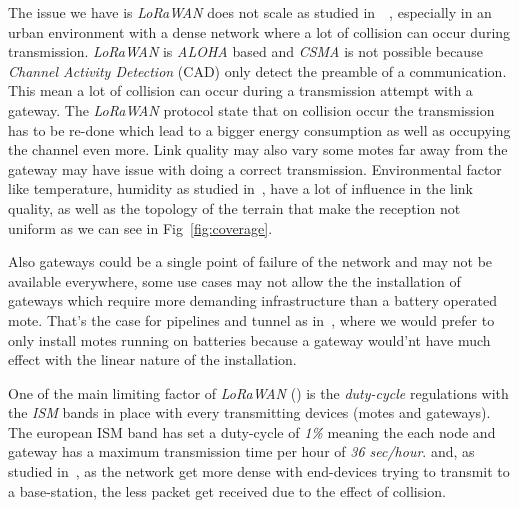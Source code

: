 

The issue we have is \emph{LoRaWAN} does not
scale as studied in~\cite{8030482}~\cite{10.1145/2988287.2989163}, especially 
in an urban environment with a dense network where a lot of collision can occur
during transmission.
\emph{LoRaWAN} is \emph{ALOHA} based and \emph{CSMA}
is not possible because \emph{Channel Activity Detection} (CAD) only detect the
preamble of a communication. This mean a lot of collision can occur during a
transmission attempt with a gateway. The \emph{LoRaWAN} protocol state that on
collision occur the transmission has to be re-done which lead to a bigger
energy consumption as well as occupying the channel even more.
Link quality may also vary some motes far away from the gateway may have issue
with doing a correct transmission. Environmental factor like temperature,
humidity as studied in~\cite{evaluation_of_the_reliability_of_lora}, have a lot of influence
in the link quality, as well as the topology of the terrain that make the
reception not uniform as we can see in Fig~\ref{fig:coverage}.

Also gateways could be a single point of failure of the network and may not be 
available everywhere, some use cases may not allow the
the installation of gateways which require more demanding infrastructure than a
battery operated mote.
That's the case for pipelines and tunnel as in~\cite{Abrardo_2019},
where we would prefer to only install motes running on batteries because a
gateway would'nt have much effect with the linear nature of the installation.

One of the main limiting factor of \emph{LoRaWAN} (\cite{8030482}) is the
\emph{duty-cycle} regulations with the \emph{ISM} bands in place with every
transmitting devices (motes and gateways). The european ISM band
has set a duty-cycle of \emph{1\%} meaning the each node and gateway has a
maximum transmission time per hour of \emph{36 sec/hour}. and, as studied in~\cite{8030482}, as the network get more dense
with end-devices trying to transmit to a base-station, the less packet get
received due to the effect of collision.




